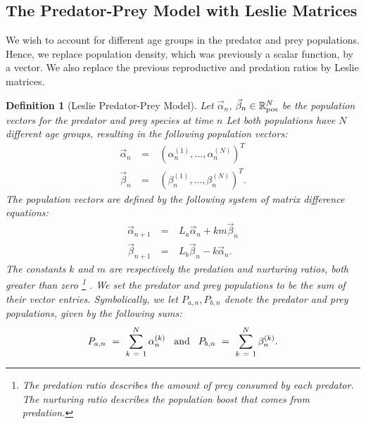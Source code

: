 \documentclass[11pt,reqno]{amsart}
\numberwithin{equation}{section}
\theoremstyle{plain}
\newtheorem{definition}[thm]{Definition}
\begin{document}
\subsection{The Predator-Prey Model with Leslie Matrices}\label{sec:PPmodels}

We wish to account for different age groups in the predator and prey populations. Hence, we replace population density, which was previously a scalar function, by a vector. We also replace the previous reproductive and predation ratios by Leslie matrices.

\begin{definition}[Leslie Predator-Prey Model]
Let $\vec \alpha_n$, $\vec \beta_n \in \mathbb R_{\rm pos}^N$ be the population vectors 
for the predator and prey species at time $n$ 
Let both populations have $N$ different age groups, resulting in the following population vectors:
\begin{eqnarray}
    \vec \alpha_n & \ = \ & (\alpha_n^{(1)}, \dots, \alpha_n^{(N)})^T
    \nonumber \\
    \vec \beta_n & \ = \ & (\beta_n^{(1)}, \dots, \beta_n^{(N)})^T.
\end{eqnarray}
 The population 
vectors are defined by the following 
system of matrix difference equations:
\begin{eqnarray}
    \vec \alpha_{n + 1} & \ = \ & L_a \vec \alpha_n + k m \vec \beta_n \nonumber \\ 
    \vec \beta_{n + 1} &\ = \ & L_b \vec \beta_n - k \vec \alpha_n.
\end{eqnarray}
The constants $k$ and $m$ are respectively the predation and nurturing ratios, both greater than zero \footnote{
The predation ratio describes the amount of prey consumed 
by each predator. The nurturing ratio describes the population boost that comes from predation. 
}
. We set the predator and prey populations to be the sum of their vector entries. Symbolically, we let $P_{a, n}, P_{b, n}$ denote the predator and prey populations, given by the following sums:
\begin{equation}
    P_{a, n} \ = \ \sum_{k \ = \  1}^{N} \alpha^{(k)}_{n}  \hspace{3mm} \textrm{and} \hspace{3mm} 
    P_{b, n} \ = \ \sum_{k \ = \  1}^{N} \beta^{(k)}_{n}. 
\end{equation}
\end{definition}
\end{document}
